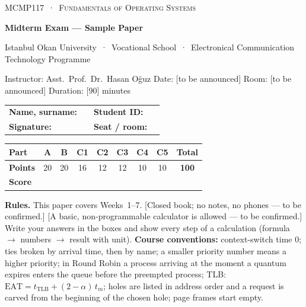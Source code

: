 \documentclass[11pt,a4paper]{article}
\begin{document}
\thispagestyle{empty}
\begin{tcolorbox}[enhanced,colback=dark,colframe=dark,arc=0pt,boxrule=0pt,
  left=18pt,right=18pt,top=14pt,bottom=14pt,coltext=white]
{\small\color{mint}\textsc{MCMP117 \,·\, Fundamentals of Operating Systems}}\par\smallskip
{\headfont\fontsize{22}{26}\selectfont\bfseries Midterm Exam --- Sample Paper}\par\smallskip
{\small Istanbul Okan University \,·\, Vocational School \,·\, Electronical Communication Technology Programme}\par
{\small Instructor: Asst.\ Prof.\ Dr.\ Hasan Oğuz \quad Date: [to be announced] \quad Room: [to be announced] \quad Duration: [90] minutes}
\end{tcolorbox}

\begin{center}
\renewcommand{\arraystretch}{1.6}
\begin{tabularx}{\linewidth}{@{}lX lX@{}}
\textbf{Name, surname:} & \hrulefill & \textbf{Student ID:} & \hrulefill \\
\textbf{Signature:} & \hrulefill & \textbf{Seat / room:} & \hrulefill \\
\end{tabularx}

\vspace{0.4em}
\renewcommand{\arraystretch}{1.35}
\begin{tabular}{|l|c|c|c|c|c|c|c|c|}
\hline
\textbf{Part} & A & B & C1 & C2 & C3 & C4 & C5 & \textbf{Total} \\ \hline
\textbf{Points} & 20 & 20 & 16 & 12 & 12 & 10 & 10 & \textbf{100} \\ \hline
\textbf{Score} & & & & & & & & \\[0.4em] \hline
\end{tabular}
\end{center}

\textbf{Rules.} This paper covers Weeks~1--7. [Closed book; no notes, no phones --- to be confirmed.] [A basic, non-programmable calculator is allowed --- to be confirmed.] Write your answers in the boxes and show every step of a calculation (formula $\to$ numbers $\to$ result with unit). \textbf{Course conventions:} context-switch time $0$; ties broken by arrival time, then by name; a smaller priority number means a higher priority; in Round Robin a process arriving at the moment a quantum expires enters the queue before the preempted process; TLB: $\text{EAT} = t_{\text{TLB}} + (2-\alpha)\,t_m$; holes are listed in address order and a request is carved from the beginning of the chosen hole; page frames start empty.
\end{document}
